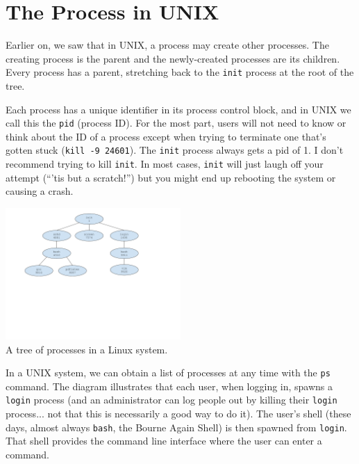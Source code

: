 




\section*{The Process in UNIX}

Earlier on, we saw that in UNIX, a process may create other processes. The creating process is the parent and the newly-created processes are its children. Every process has a parent, stretching back to the \texttt{init} process at the root of the tree.

Each process has a unique identifier in its process control block, and in UNIX we call this the \texttt{pid} (process ID). For the most part, users will not need to know or think about the ID of a process except when trying to terminate one that's gotten stuck (\texttt{kill -9 24601}). The \texttt{init} process always gets a pid of 1. I don't recommend trying to kill \texttt{init}. In most cases, \texttt{init} will just laugh off your attempt (``'tis but a scratch!'') but you might end up rebooting the system or causing a crash.

\begin{center}
\includegraphics[width=0.5\textwidth]{images/linux-process-tree.pdf}\\
A tree of processes in a Linux system.
\end{center}

In a UNIX system, we can obtain a list of processes at any time with the \texttt{ps} command. The diagram illustrates that each user, when logging in, spawns a \texttt{login} process (and an administrator can log people out by killing their \texttt{login} process... not that this is necessarily a good way to do it). The user's shell (these days, almost always \texttt{bash}, the Bourne Again Shell) is then spawned from \texttt{login}. That shell provides the command line interface where the user can enter a command.

